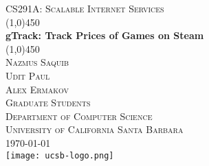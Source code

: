 \documentclass[12pt]{report}
\begin{document}
\begin{titlepage}
	\begin{center}
		\textsc{\normalsize{CS291A: Scalable Internet Services}}\\[0.5cm]
		\line(1,0){450}\\[0.25in]
		\huge{\bfseries gTrack: Track Prices of Games on Steam}\\[2mm]
		\line(1,0){450}\\[1.5cm]
		\textsc{\LARGE Nazmus Saquib}\\
		\textsc{\LARGE Udit Paul}\\
		\textsc{\LARGE Alex Ermakov}\\[0.75cm]
		\textsc{\large Graduate Students}\\
		\textsc{\large Department of Computer Science}\\
		\textsc{\large University of California Santa Barbara}\\[0.75cm]
		\textsc{\large\today}\\[2.0cm]
		\texttt{[image: ucsb-logo.png]}
	\end{center}
\end{titlepage}

\tableofcontents
\newpage











\end{document}
